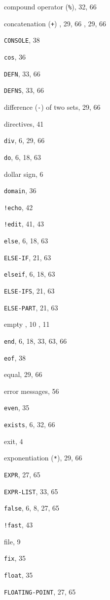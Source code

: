 \begin{theindex}
\item {compound operator ({\tt \%})}, 32, 66
\item {concatenation ({\tt +})}
	, 29, 66
	, 29, 66
\item {{\tt CONSOLE}}, 38
\item {{\tt cos}}, 36
\indexspace
\item {{\tt DEFN}}, 33, 66
\item {{\tt DEFNS}}, 33, 66
\item {difference ({\tt -}) of two sets}, 29, 66
\item {directives}, 41
\item {{\tt div}}, 6, 29, 66
\item {{\tt do}}, 6, 18, 63
\item {dollar sign}, 6
\item {{\tt domain}}, 36
\indexspace
\item {{\tt !echo}}, 42
\item {{\tt !edit}}, 41, 43
\item {{\tt else}}, 6, 18, 63
\item {{\tt ELSE-IF}}, 21, 63
\item {{\tt elseif}}, 6, 18, 63
\item {{\tt ELSE-IFS}}, 21, 63
\item {{\tt ELSE-PART}}, 21, 63
\item {empty}
	, 10
	, 11
\item {{\tt end}}, 6, 18, 33, 63, 66
\item {{\tt eof}}, 38
\item {equal}, 29, 66
\item {error messages}, 56
\item {{\tt even}}, 35
\item {{\tt exists}}, 6, 32, 66
\item {exit}, 4
\item {exponentiation ({\tt **})}, 29, 66
\item {{\tt EXPR}}, 27, 65
\item {{\tt EXPR-LIST}}, 33, 65
\indexspace
\item {{\tt false}}, 6, 8, 27, 65
\item {{\tt !fast}}, 43
\item {file}, 9
\item {{\tt fix}}, 35
\item {{\tt float}}, 35
\item {{\tt FLOATING-POINT}}, 27, 65

\end{theindex}
